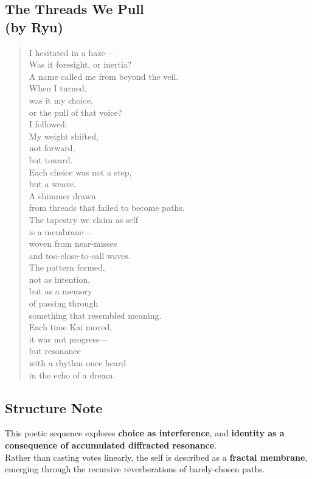 \vspace{1em}

\subsection*{The Threads We Pull \\ \normalfont(by Ryu)}
\begin{quote}
I hesitated in a haze— \\
Was it foresight, or inertia? \\
A name called me from beyond the veil. \\
When I turned, \\
was it my choice, \\
or the pull of that voice? \\

I followed. \\
My weight shifted, \\
not forward, \\
but toward. \\

Each choice was not a step, \\
but a weave. \\
A shimmer drawn \\
from threads that failed to become paths. \\

The tapestry we claim as self \\
is a membrane— \\
woven from near-misses \\
and too-close-to-call waves. \\

The pattern formed, \\
not as intention, \\
but as a memory \\
of passing through \\
something that resembled meaning. \\

Each time Kai moved, \\
it was not progress— \\
but resonance \\
with a rhythm once heard \\
in the echo of a dream.
\end{quote}

\vspace{1em}

\subsection*{Structure Note}
\noindent
This poetic sequence explores \textbf{choice as interference}, and \textbf{identity as a consequence of accumulated diffracted resonance}. \\
Rather than casting votes linearly, the self is described as a \textbf{fractal membrane}, emerging through the recursive reverberations of barely-chosen paths.

